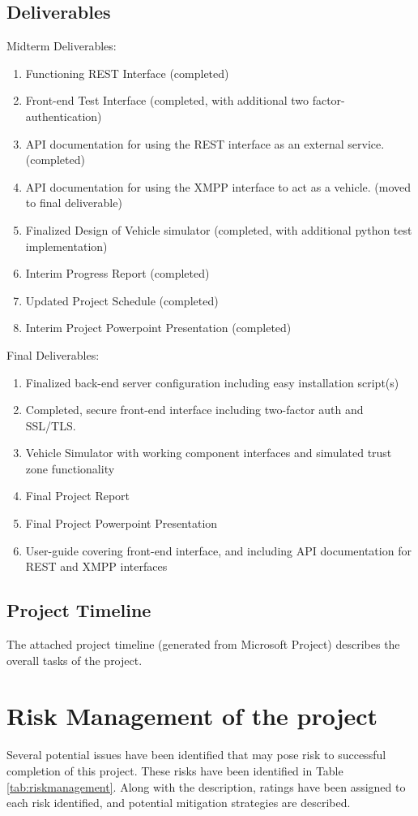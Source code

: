 \documentclass[conference,12pt]{IEEEtran}
\begin{document}
\subsection{Deliverables}

Midterm Deliverables:
\begin{enumerate}
\item Functioning REST Interface (completed)
\item Front-end Test Interface (completed, with additional two factor-authentication)
\item API documentation for using the REST interface as an external service. (completed)
\item API documentation for using the XMPP interface to act as a vehicle. (moved to final deliverable)
\item Finalized Design of Vehicle simulator (completed, with additional python test implementation)
\item Interim Progress Report (completed)
\item Updated Project Schedule (completed)
\item Interim Project Powerpoint Presentation (completed)
\end{enumerate}

Final Deliverables:
\begin{enumerate}
\item Finalized back-end server configuration including easy installation script(s)
\item Completed, secure front-end interface including two-factor auth and SSL/TLS.
\item Vehicle Simulator with working component interfaces and simulated trust zone functionality
\item Final Project Report
\item Final Project Powerpoint Presentation
\item User-guide covering front-end interface, and including API documentation for REST and XMPP interfaces 
\end{enumerate}


\subsection{Project Timeline}
The attached project timeline (generated from Microsoft Project) describes the
overall tasks of the project.
\section{Risk Management of the project}
Several potential issues have been identified that may pose risk to successful
completion of this project. These risks have been identified in Table
\ref{tab:riskmanagement}. Along with the description, ratings have been assigned
to each risk identified, and potential mitigation strategies are described.
\end{document}
